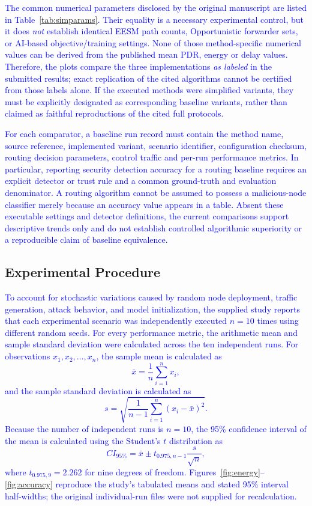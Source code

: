 \documentclass[pdflatex,sn-mathphys-num]{sn-jnl}
\newcommand{\Revised}[1]{\textcolor{blue}{#1}}
\begin{document}
\Revised{The common numerical parameters disclosed by the original manuscript are listed in Table~\ref{tab:simparams}. Their equality is a necessary experimental control, but it does \emph{not} establish identical EESM path counts, Opportunistic forwarder sets, or AI-based objective/training settings. None of those method-specific numerical values can be derived from the published mean PDR, energy or delay values. Therefore, the plots compare the three implementations \emph{as labeled} in the submitted results; exact replication of the cited algorithms cannot be certified from those labels alone. If the executed methods were simplified variants, they must be explicitly designated as corresponding baseline variants, rather than claimed as faithful reproductions of the cited full protocols.}

\Revised{For each comparator, a baseline run record must contain the method name, source reference, implemented variant, scenario identifier, configuration checksum, routing decision parameters, control traffic and per-run performance metrics. In particular, reporting security detection accuracy for a routing baseline requires an explicit detector or trust rule and a common ground-truth and evaluation denominator. A routing algorithm cannot be assumed to possess a malicious-node classifier merely because an accuracy value appears in a table. Absent these executable settings and detector definitions, the current comparisons support descriptive trends only and do not establish controlled algorithmic superiority or a reproducible claim of baseline equivalence.}\par

\subsection{Experimental Procedure}

\textcolor{blue}{To account for stochastic variations caused by random node deployment, traffic generation, attack behavior, and model initialization, the supplied study reports that each experimental scenario was independently executed $n=10$ times using different random seeds. For every performance metric, the arithmetic mean and sample standard deviation were calculated across the ten independent runs. For observations $x_1,x_2,\ldots,x_n$, the sample mean is calculated as
\begin{equation}
\bar{x}=\frac{1}{n}\sum_{i=1}^{n}x_i,
\end{equation}
and the sample standard deviation is calculated as
\begin{equation}
s=\sqrt{\frac{1}{n-1}\sum_{i=1}^{n}(x_i-\bar{x})^2}.
\end{equation}
Because the number of independent runs is $n=10$, the 95\% confidence interval of the mean is calculated using the Student's $t$ distribution as
\begin{equation}
CI_{95\%}
=
\bar{x}
\pm
t_{0.975,n-1}\frac{s}{\sqrt{n}},
\end{equation}
where $t_{0.975,9}=2.262$ for nine degrees of freedom. Figures~\ref{fig:energy}--\ref{fig:accuracy} reproduce the study's tabulated means and stated 95\% interval half-widths; the original individual-run files were not supplied for recalculation.}
\end{document}
